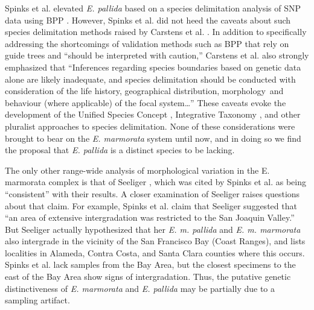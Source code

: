 \documentclass[10pt,letterpaper]{article}
\begin{document}
Spinks et al. \cite{Spinks2014} elevated \textit{E. pallida} based on a species delimitation analysis of SNP data using BPP \cite{Yang2010b}. However, Spinks et al. \cite{Spinks2014} did not heed the caveats about such species delimitation methods raised by Carstens et al. \cite{Carstens2013}. In addition to specifically addressing the shortcomings of validation methods such as BPP that rely on guide trees and ``should be interpreted with caution,'' Carstens et al. \cite{Carstens2013} also strongly emphasized that ``Inferences regarding species boundaries based on genetic data alone are likely inadequate, and species delimitation should be conducted with consideration of the life history, geographical distribution, morphology and behaviour (where applicable) of the focal system\dots'' These caveats evoke the development of the Unified Species Concept \cite{Dayrat2005a,DeQueiroz2007b}, Integrative Taxonomy \cite{Padial2010}, and other pluralist approaches to species delimitation. None of these considerations were brought to bear on the \textit{E. marmorata} system until now, and in doing so we find the proposal that \textit{E. pallida} is a distinct species to be lacking. 

The only other range-wide analysis of morphological variation in the E. marmorata complex is that of Seeliger \cite{Seeliger1945}, which was cited by Spinks et al. \cite{Spinks2014} as being “consistent” with their results. A closer examination of Seeliger \cite{Seeliger1945} raises questions about that claim.  For example, Spinks et al. \cite{Spinks2014} claim that Seeliger \cite{Seeliger1945} suggested that “an area of extensive intergradation was restricted to the San Joaquin Valley.” But Seeliger actually hypothesized that her \textit{E. m. pallida} and \textit{E. m. marmorata} also intergrade in the vicinity of the San Francisco Bay (Coast Ranges), and lists localities in  Alameda, Contra Costa, and Santa Clara counties where this occurs. Spinks et al. lack samples from the Bay Area, but the closest specimens to the east of the Bay Area show signs of intergradation. Thus, the putative genetic distinctiveness of \textit{E. marmorata} and \textit{E. pallida} may be partially due to a sampling artifact. 
\end{document}
